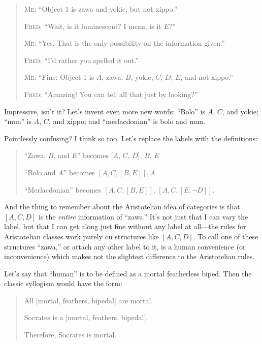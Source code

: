 {{\begin{quotation}
{
 \textsc{Me}: ``Object 1 is zawa and yokie, but not
xippo.''}

{
 \textsc{Fred}: ``Wait, is it luminescent? I mean, is it
$E$?''}

{
 \textsc{Me}: ``Yes. That is the only possibility on the
information given.''}

{
 \textsc{Fred}: ``I'd rather you spelled it
out.''}

{
 \textsc{Me}: ``Fine: Object 1 is $A$, zawa, $B$, yokie, $C$, $D$,
$E$, and not xippo.''}

{
 \textsc{Fred}: ``Amazing! You can tell all that just by
 looking?''}
\end{quotation}

{
 Impressive, isn't it? Let's invent
even more new words: ``Bolo'' is $A$,
$C$, and yokie; ``mun'' is $A$, $C$, and
xippo; and ``merlacdonian'' is bolo
and mun.}

{
 Pointlessly confusing? I think so too. Let's
replace the labels with the definitions:}

\begin{quotation}

 ``Zawa, $B$, and $E$'' becomes [$A$,
$C$, $D$], $B$, $E$

{
 ``Bolo and $A$'' becomes $[A, C,
[B, E]], A$}

{
 ``Merlacdonian'' becomes $[A, C,
    [B, E]]$, $[A, C, [E, \lnot D]]$.}
\end{quotation}

{
 And the thing to remember about the Aristotelian idea of
categories is that $[A, C, D]$ is the \textit{entire} information of
``zawa.'' It's not
just that I can vary the label, but that I can get along just fine
without any label at all---the rules for Aristotelian classes work
purely on structures like $[A, C, D]$. To call one of these structures
``zawa,'' or attach any other label
to it, is a human convenience (or inconvenience) which makes not the
slightest difference to the Aristotelian rules.}

{
 Let's say that
``human'' is to be defined as a
mortal featherless biped. Then the classic syllogism would have the
form:}

\begin{quotation}
{
 All [mortal, {\textlnot}feathers, bipedal] are mortal.}

{
 Socrates is a [mortal, {\textlnot}feathers, bipedal].}

{
  Therefore, Socrates is mortal.}
\end{quotation}

}}
